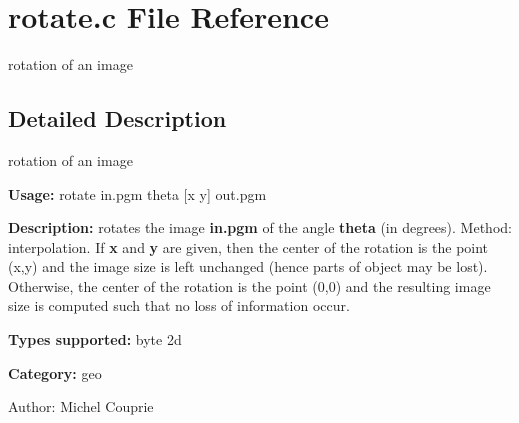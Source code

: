 \section{rotate.c File Reference}
\label{rotate_8c}
rotation of an image 



\subsection{Detailed Description}
rotation of an image 

{\bf Usage:} rotate in.pgm theta [x y] out.pgm

{\bf Description:} rotates the image {\bf in.pgm} of the angle {\bf theta} (in degrees). Method: interpolation. If {\bf x} and {\bf y} are given, then the center of the rotation is the point (x,y) and the image size is left unchanged (hence parts of object may be lost). Otherwise, the center of the rotation is the point (0,0) and the resulting image size is computed such that no loss of information occur.

{\bf Types supported:} byte 2d

{\bf Category:} geo

\begin{Desc}
\item[Author:]Michel Couprie \end{Desc}
